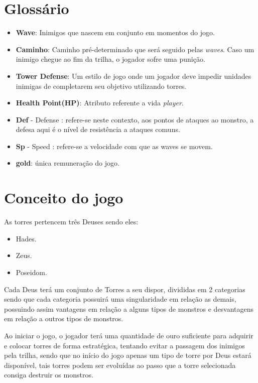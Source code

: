\documentclass[11pt]{article} %
\begin{document}
\section{Glossário}
\begin{itemize}
\item \textbf{Wave}: Inimigos que nascem em conjunto em momentos do jogo.
\item \textbf{Caminho}: Caminho pré-determinado que será seguido pelas \textit{waves}. Caso um inimigo chegue ao fim da trilha, o jogador sofre uma punição.
\item \textbf{Tower Defense}: Um estilo de jogo onde um jogador deve impedir unidades inimigas de completarem seu objetivo utilizando torres.
\item \textbf{Health Point(HP)}: Atributo referente a vida \textit{player}.
\item \textbf{Def} - Defense : refere-se neste contexto, aos pontos de ataques ao monstro, a defesa aqui é o nível de resistência a ataques comuns.
\item \textbf{Sp} - Speed : refere-se a velocidade com que as waves se movem.
\item \textbf{gold}: única remuneração do jogo.
\end{itemize} 
 
\section{Conceito do jogo}

As torres pertencem  três Deuses sendo eles:
\begin{itemize}
\item Hades.
\item Zeus.
\item Poseidom.
\end{itemize}

Cada Deus terá um conjunto de Torres a seu dispor, divididas em 2 categorias sendo que cada categoria possuirá uma singularidade em relação as demais, possuindo assim vantagens em relação a alguns tipos de monstros e desvantagens em relação a outros tipos de monstros.

Ao iniciar o jogo, o jogador terá uma quantidade de ouro suficiente para adquirir e colocar torres de forma estratégica, tentando evitar a passagem dos inimigos pela trilha, sendo que no início do jogo apenas um tipo de torre por Deus estará disponível, tais torres podem ser evoluídas ao passo que a torre selecionada consiga destruir os monstros. 
\end{document}
